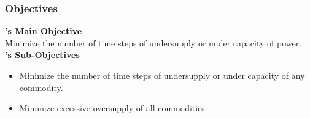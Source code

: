 \begin{frame}
    \frametitle{\deploy Objectives}
    \textbf{\deploy's Main Objective}
    \vspace{0.3em}
    \\
    Minimize the number of time steps of undersupply or under capacity 
    of power.
    \vspace{1em}
    \\
    \textbf{\deploy's Sub-Objectives}
    \begin{itemize}
        \item Minimize the number of time steps of undersupply or under capacity 
        of any commodity.
        \item Minimize excessive oversupply of all commodities  
    \end{itemize} 
\end{frame}

